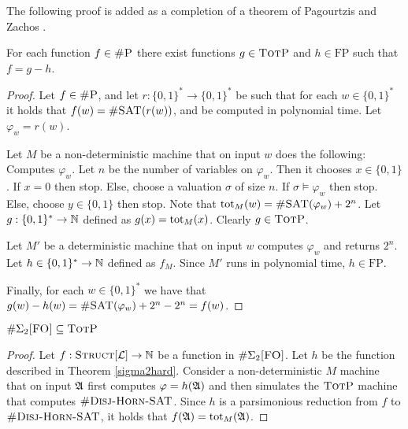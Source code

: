 The following proof is added as a completion of a theorem of Pagourtzis and Zachos \cite{DBLP:conf/mfcs/PagourtzisZ06}.
\begin{theo} \label{diff}
	For each function $f\in\textsc{\#P}$ there exist functions $g\in \textsc{TotP}$ and $h\in\text{FP}$ such that $f = g - h$.
\end{theo}
\begin{proof}
	Let $f\in\textsc{\#P}$, and let $r:\{0,1\}^*\to\{0,1\}^*$ be such that for each $w\in\{0,1\}^*$ it holds that $f(w) = \textsc{\#SAT}(r(w))$, and be computed in polynomial time. Let $\varphi_w = r(w)$.
	
	Let $M$ be a non-deterministic machine that on input $w$ does the following: Computes $\varphi_w$. Let $n$ be the number of variables on $\varphi_w$. Then it chooses $x\in\{0,1\}$. If $x = 0$ then stop. Else, choose a valuation $\sigma$ of size $n$. If $\sigma\models\varphi_w$ then stop. Else, choose $y\in\{0,1\}$ then stop. Note that $\text{tot}_M(w) = \textsc{\#SAT}(\varphi_w)+2^n$. Let $g:\{0,1\}^*\to\mathbb{N}$ defined as $g(x) = \text{tot}_M(x)$. Clearly $g\in\textsc{TotP}$.
	
	Let $M'$ be a deterministic machine that on input $w$ computes $\varphi_w$ and returns $2^n$. Let $h\in\{0,1\}^*\to\mathbb{N}$ defined as $f_M$. Since $M'$ runs in polynomial time, $h\in\text{FP}$.
	
	Finally, for each $w\in\{0,1\}^*$ we have that $g(w) - h(w) = \textsc{\#SAT}(\varphi_w) + 2^n - 2^n = f(w)$.
\end{proof}

\begin{theo}
	$\#\Sigma_{2}\textsc{[FO]} \subseteq \textsc{TotP}$
\end{theo}
\begin{proof}
	Let $f:\textsc{Struct}[{\cal L}]\to\mathbb{N}$ be a function in $\#\Sigma_{2}\textsc{[FO]}$. Let $h$ be the function described in Theorem \ref{sigma2hard}. Consider a non-deterministic $M$ machine that on input ${\frak A}$ first computes $\varphi = h({\frak A})$ and then simulates the $\textsc{TotP}$ machine that computes $\textsc{\#Disj-Horn-SAT}$. Since $h$ is a parsimonious reduction from $f$ to $\textsc{\#Disj-Horn-SAT}$, it holds that $f({\frak A}) = \text{tot}_M({\frak A})$.
\end{proof}

